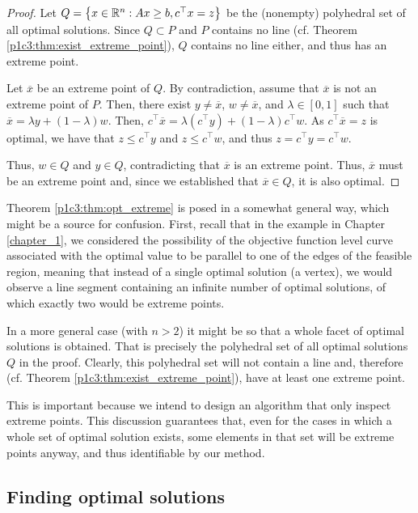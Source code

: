 \begin{proof}
	Let $Q = \left\{ x \in \mathbb{R}^n : Ax \geq b, c^\top x = z \right \}$ be the (nonempty) polyhedral set of all optimal solutions. Since $Q \subset P$ and $P$ contains no line (cf. Theorem \ref{p1c3:thm:exist_extreme_point}), $Q$ contains no line either, and thus has an extreme point.

	Let $\overline{x}$ be an extreme point of $Q$. By contradiction, assume that $\overline{x}$ is not an extreme point of $P$. Then, there exist $y \neq \overline{x}$, $w \neq \overline{x}$, and $\lambda \in [0,1]$ such that $\overline{x} = \lambda y + (1-\lambda)w$. Then, $c^\top \overline{x} = \lambda (c^\top y) + (1-\lambda)c^\top w$. As $c^\top \overline{x} = z$ is optimal, we have that $z \leq c^\top y$ and $z \leq c^\top w$,  and thus $z = c^\top y = c^\top w$. 
	
	Thus, $w \in Q$ and $y \in Q$, contradicting that $\overline{x}$ is an extreme point. Thus, $\overline{x}$ must be an extreme point and, since we established that $\overline{x} \in Q$, it is also optimal. 
\end{proof}

Theorem \ref{p1c3:thm:opt_extreme} is posed in a somewhat general way, which might be a source for confusion. First, recall that in the example in Chapter \ref{chapter_1}, we considered the possibility of the objective function level curve associated with the optimal value to be parallel to one of the edges of the feasible region, meaning that instead of a single optimal solution (a vertex), we would observe a line segment containing an infinite number of optimal solutions, of which exactly two would be extreme points. 

In a more general case (with $n > 2$) it might be so that a whole facet of optimal solutions is obtained. That is precisely the polyhedral set of all optimal solutions $Q$ in the proof. Clearly, this polyhedral set will not contain a line and, therefore (cf. Theorem \ref{p1c3:thm:exist_extreme_point}), have at least one extreme point. 

This is important because we intend to design an algorithm that only inspect extreme points. This discussion guarantees that, even for the cases in which a whole set of optimal solution exists, some elements in that set will be extreme points anyway, and thus identifiable by our method.


\subsection{Finding optimal solutions}


